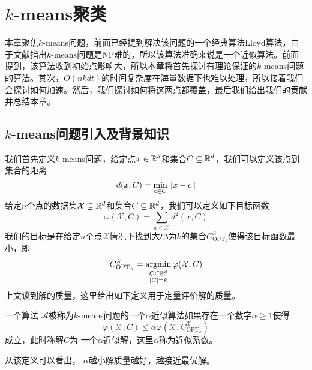 \chapter{\texorpdfstring{$k$}{k}-means聚类}
本章聚焦$k$-means问题，前面已经提到解决该问题的一个经典算法Lloyd算法，由于文献\cite{garey1982complexity,kleinberg1998microeconomic,mahajan2009planar}指出$k$-means问题是NP难的，所以该算法准确来说是一个近似算法。前面提到，该算法收到初始点影响大，所以本章将首先探讨有理论保证的$k$-means问题的算法。其次，$O(nkdt)$的时间复杂度在海量数据下也难以处理，所以接着我们会探讨如何加速。然后，我们探讨如何将这两点都覆盖，最后我们给出我们的贡献并总结本章。

\section{\texorpdfstring{$k$}{k}-means问题引入及背景知识}
我们首先定义$k$-means问题，给定点$x \in \mathbb{R}^d$和集合$C \subseteq \mathbb{R}^d$，我们可以定义该点到集合的距离
\begin{equation*}
d(x,C) = \min\limits_{c \in C}\left\lVert x - c\right\rVert
\end{equation*}
给定$n$个点的数据集$\mathcal{X} \subseteq \mathbb{R}^d$和集合$C \subseteq \mathbb{R}^d$，我们可以定义如下目标函数
\begin{equation*}
\varphi(\mathcal{X},C) = \sum_{x \in \mathcal{X}}d^2 (x,C)
\end{equation*}
我们的目标是在给定$n$个点$\mathcal{X}$情况下找到大小为$k$的集合$C_{\text{OPT}_k}^\mathcal{X}$使得该目标函数最小，即
\begin{equation*}
C_{\text{OPT}_k}^\mathcal{X} = \operatorname*{argmin}\limits_{ \substack{C \subseteq \mathbb{R}^d \\ |C| = k} }\varphi(\mathcal{X},C)
\end{equation*}
上文谈到解的质量，这里给出如下定义用于定量评价解的质量。
\begin{definition}[$k$-means问题解的质量]
    \label{def: k-means_quality}
    一个算法 $\mathcal{A}$被称为$k$-means问题的一个$\alpha$近似算法如果存在一个数字$\alpha \geq 1$使得
    \begin{equation*}
        \varphi(\mathcal{X},C) \leq \alpha \varphi(\mathcal{X},C_{\text{OPT}_k}^{\mathcal{X}})
    \end{equation*}
    成立，此时称解$C$为
一个$\alpha$近似解，这里$\alpha$称为近似系数。
\end{definition}
从该定义可以看出， $\alpha$越小解质量越好，越接近最优解。